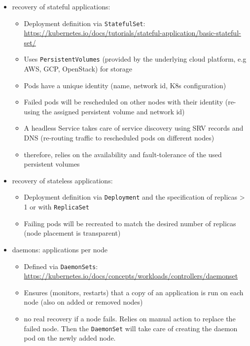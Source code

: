 \begin{enumerate}
          \begin{itemize}
            \item recovery of stateful applications:
              \begin{itemize}
                \item Deployment definition via \texttt{StatefulSet}: \url{https://kubernetes.io/docs/tutorials/stateful-application/basic-stateful-set/}
                \item  Uses \texttt{PersistentVolumes} (provided by the underlying cloud platform, e.g AWS, GCP, OpenStack) for storage
                \item Pods have a unique identity (name, network id, K8s configuration)
                \item Failed pods will be rescheduled on other nodes with their identity (re-using the assigned persistent volume and network id)
                \item A headless Service takes care of service discovery using SRV records and DNS (re-routing traffic to rescheduled pods on different nodes)
                \item therefore, relies on the availability and fault-tolerance of the used persistent volumes
              \end{itemize}

            \item recovery of stateless applications:
              \begin{itemize}
                \item Deployment definition via \texttt{Deployment} and the specification of replicas > 1 or with \texttt{ReplicaSet}
                \item Failing pods will be recreated to match the desired number of replicas (node placement is transparent)
              \end{itemize}

            \item daemons: applications per node
              \begin{itemize}
                \item Defined via \texttt{DaemonSets}: \url{https://kubernetes.io/docs/concepts/workloads/controllers/daemonset}
                \item Ensures (monitors, restarts) that a copy of an application is run on each node (also on added or removed nodes)
                \item no real recovery if a node fails. Relies on manual action to replace the failed node. Then the \texttt{DaemonSet} will take care of creating the daemon pod on the newly added node.
              \end{itemize}
          \end{itemize}
  \end{enumerate}


